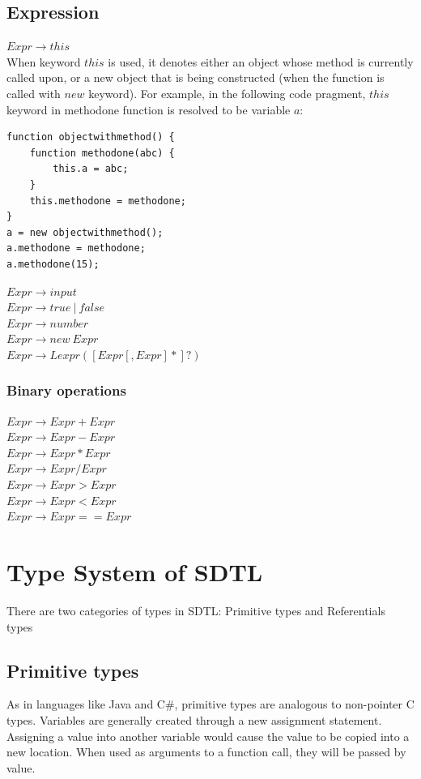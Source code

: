 \documentclass[a4paper,12pt]{article}
\begin{document}
\subsection{Expression}
$Expr \rightarrow this$\\
When keyword $this$ is used, it denotes either an object whose method is currently called upon, or a new object that is being constructed (when the function is called with $new$ keyword). For example, in the following code pragment, $this$ keyword in methodone function is resolved to be variable $a$:\\
\begin{lstlisting}[caption=this]
function objectwithmethod() {
	function methodone(abc) {
		this.a = abc;
	}
	this.methodone = methodone;
}
a = new objectwithmethod();
a.methodone = methodone;
a.methodone(15);
\end{lstlisting}
$Expr \rightarrow input$\\
$Expr \rightarrow true\ |\ false$\\
$Expr \rightarrow number$\\
$Expr \rightarrow new\  Expr$\\
$Expr \rightarrow Lexpr ([Expr[,Expr]*]?)$\\


\subsubsection{Binary operations}
$Expr \rightarrow Expr + Expr$\\
$Expr \rightarrow Expr - Expr$\\
$Expr \rightarrow Expr * Expr$\\
$Expr \rightarrow Expr / Expr$\\
$Expr \rightarrow Expr > Expr$\\
$Expr \rightarrow Expr < Expr$\\
$Expr \rightarrow Expr == Expr$\\

\section{Type System of SDTL}
There are two categories of types in SDTL: Primitive types and Referentials types
\subsection{Primitive types}
As in languages like Java and C\#, primitive types are analogous to non-pointer C types. Variables are generally created through a new assignment statement. Assigning a value into another variable would cause the value to be copied into a new location. When used as arguments to a function call, they will be passed by value.
\end{document}
